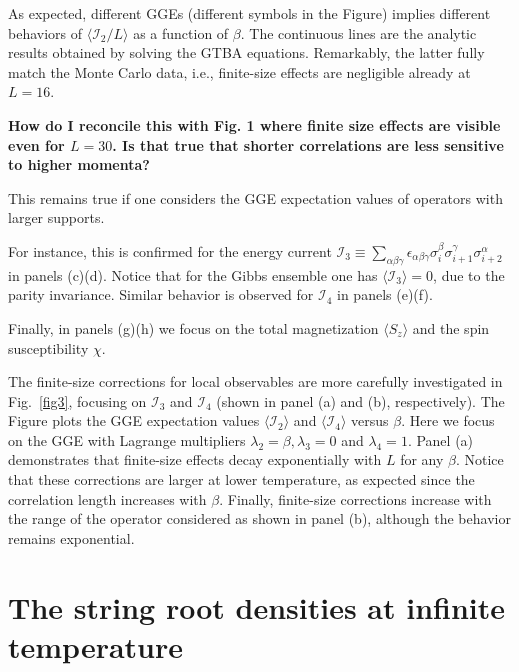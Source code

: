 \documentclass[twocolumn,superscriptaddress,prb,10pt]{revtex4-1}
\begin{document}
As expected, different GGEs (different symbols in the Figure) implies different behaviors of  
$\langle {\mathcal I}_2/L\rangle$ as a function of $\beta$. The continuous lines are the 
analytic results obtained by solving the GTBA equations. Remarkably, the latter fully 
match the Monte Carlo data, i.e., finite-size effects are negligible already at $L=16$. 

{\bf How do I reconcile this with Fig. 1 where finite size effects are visible even for 
$L=30$. Is that true that shorter correlations are less sensitive to higher momenta?}

This remains true if one considers the GGE expectation values of operators with larger 
supports. 

For instance, this is confirmed for the energy current ${\mathcal I}_3\equiv\sum_{\alpha\beta\gamma}
\epsilon_{\alpha\beta\gamma}\sigma^\beta_i\sigma^\gamma_{i+1}\sigma^\alpha_{i+2}$ in 
panels (c)(d). Notice that for the Gibbs ensemble one has $\langle {\mathcal I}_3\rangle=0$, 
due to the parity invariance. Similar behavior is observed for ${\mathcal I}_4$ in panels (e)(f). 

Finally, in panels (g)(h) we focus on the total magnetization $\langle S_z\rangle$ and the spin 
susceptibility $\chi$. 


The finite-size corrections for local observables are more carefully investigated 
in Fig.~\ref{fig3}, focusing on ${\mathcal I}_3$ and ${\mathcal I}_4$ (shown in 
panel (a) and (b), respectively). The Figure plots the GGE expectation values 
$\langle{\mathcal I}_2\rangle$ and $\langle {\mathcal I}_4\rangle$ versus $\beta$. 
Here we focus on the GGE with Lagrange multipliers $\lambda_2=\beta,\lambda_3=0$ 
and $\lambda_4=1$. Panel (a) demonstrates that finite-size effects decay 
exponentially with $L$ for any $\beta$. Notice that these corrections are 
larger at lower temperature, as expected since the correlation length 
increases with $\beta$. Finally, finite-size corrections increase with the 
range of the operator considered as shown in panel (b), although the 
behavior remains exponential. 






\section{The string root densities at infinite temperature}
\end{document}
